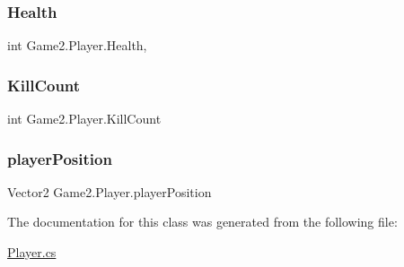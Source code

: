 \subsubsection{\texorpdfstring{Health}{Health}}
{\footnotesize\ttfamily int Game2.\+Player.\+Health\hspace{0.3cm}{\ttfamily [get]}, {\ttfamily [set]}}

\mbox{\label{class_game2_1_1_player_a0de12ae1963fa77b943c0da0c41d9a38}} 
\subsubsection{\texorpdfstring{Kill\+Count}{KillCount}}
{\footnotesize\ttfamily int Game2.\+Player.\+Kill\+Count\hspace{0.3cm}{\ttfamily [get]}}

\mbox{\label{class_game2_1_1_player_a03cfdc80acd38082853948af2f299824}} 
\subsubsection{\texorpdfstring{player\+Position}{playerPosition}}
{\footnotesize\ttfamily Vector2 Game2.\+Player.\+player\+Position\hspace{0.3cm}{\ttfamily [get]}}



The documentation for this class was generated from the following file\+:\begin{DoxyCompactItemize}
\item 
\mbox{\hyperlink{_player_8cs}{Player.\+cs}}\end{DoxyCompactItemize}
